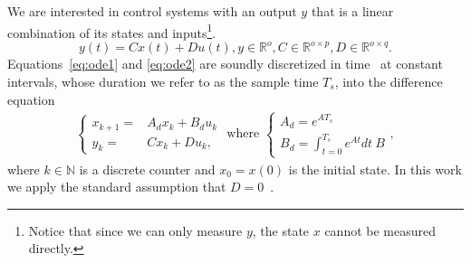 \documentclass[a4paper,UKenglish]{lipics-v2018}
\newcommand{\mat}[1]{{#1}}
\renewcommand{\vec}[1]{{#1}}
\begin{document}
We are interested in control systems with an output $\vec{y}$ that is a
linear combination of its states and inputs\footnote{Notice that since we
can only measure $\vec{y}$, the state $\vec{x}$ cannot be measured directly.}.
%
\begin{equation}
\label{eq:ode2}  
\vec{y}(t)=\mat{C}\vec{x}(t)+\mat{D}\vec{u}(t),
\vec{y} \in \mathbb{R}^o,
\mat{C} \in \mathbb{R}^{o \times p},
\mat{D} \in \mathbb{R}^{o \times q}. 
\end{equation}
%
Equations~\eqref{eq:ode1} and \eqref{eq:ode2} are soundly discretized in
time~\cite{middleton1990digital,van1978computing} at constant intervals,
whose duration we refer to as the sample time $T_s$, into the difference
equation
%
\begin{align}
\label{eq:plant}
\left\{
\begin{array}{rl}
\vec{x}_{k+1} =& \mat{A}_d \vec{x}_k+ \mat{B}_d \vec{u}_k\\
\vec{y}_{k} =& \mat{C} \vec{x}_k + \mat{D} \vec{u}_k, 
\end{array}
\right.
\text{ where }
\left\{
\begin{array}{l}
\mat{A}_d=e^{\mat{A}T_s}\\
\mat{B}_d = \int_{t = 0}^{T_s} e^{\mat{A} t} dt\ \mat{B}
\end{array}
\right.,
\end{align} 
%
%
where $k \in \mathbb N$ is a discrete counter and $\vec{x}_{0}=\vec{x}(0)$
is the initial state.  In this work we apply the standard assumption that
$\mat{D}=\mat{0}$~\cite{Astrom08}.
%

\end{document}
